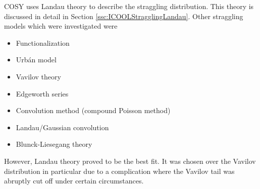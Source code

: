  \label{sec:COSYStraggling}\par
COSY uses Landau theory \cite{landau} to describe the straggling distribution. This theory is discussed in detail in Section \ref{ssc:ICOOLStragglingLandau}. Other straggling models which were investigated were
\begin{itemize}
\item{Functionalization}
\item{Urb\'{a}n model \cite{geant4}}
\item{Vavilov theory \cite{vavilov}}
\item{Edgeworth series \cite{edgeworth}}
\item{Convolution method (compound Poisson method) \cite{kellerer}}
\item{Landau/Gaussian convolution \cite{hancock}}
\item{Blunck-Liesegang theory \cite{blunck}}
\end{itemize}
However, Landau theory proved to be the best fit. It was chosen over the Vavilov distribution in particular due to a complication where the Vavilov tail was abruptly cut off under certain circumstances.

